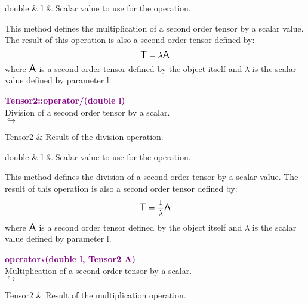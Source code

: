 \begin{tcolorbox}[width=\textwidth,myArgs,tabularx={ll|R}]
double & l & Scalar value to use for the operation.
\end{tcolorbox}

This method defines the multiplication of a second order tensor by a scalar value.
The result of this operation is also a second order tensor defined by:
\begin{equation*}
\mbox{\large\ensuremath{\mathsf{T}}} = \lambda \mbox{\large\ensuremath{\mathsf{A}}}
\end{equation*}
where $\mbox{\large\ensuremath{\mathsf{A}}}$ is a second order tensor defined by the object itself and $\lambda$ is the scalar value defined by parameter l.

\textcolor{purple}{\textbf{Tensor2::operator/(double l)}}\label{Tensor2::operator/(double l)}\\
Division of a second order tensor by a scalar.\\ \hspace*{5mm}$\hookrightarrow$
\vspace*{-2em}\begin{tcolorbox}[grow to left by=-1cm, width=\textwidth-1cm,myArgs,tabularx={l|R}]
Tensor2 & Result of the division operation.
\end{tcolorbox}

\begin{tcolorbox}[width=\textwidth,myArgs,tabularx={ll|R}]
double & l & Scalar value to use for the operation.
\end{tcolorbox}

This method defines the division of a second order tensor by a scalar value.
The result of this operation is also a second order tensor defined by:
\begin{equation*}
\mbox{\large\ensuremath{\mathsf{T}}} = \frac{1}{\lambda} \mbox{\large\ensuremath{\mathsf{A}}}
\end{equation*}
where $\mbox{\large\ensuremath{\mathsf{A}}}$ is a second order tensor defined by the object itself and $\lambda$ is the scalar value defined by parameter l.

\textcolor{purple}{\textbf{operator$\star$(double l, Tensor2 A)}}\label{operator*(double l, Tensor2 A)}\\
Multiplication of a second order tensor by a scalar.\\ \hspace*{5mm}$\hookrightarrow$
\vspace*{-2em}\begin{tcolorbox}[grow to left by=-1cm, width=\textwidth-1cm,myArgs,tabularx={l|R}]
Tensor2 & Result of the multiplication operation.
\end{tcolorbox}

